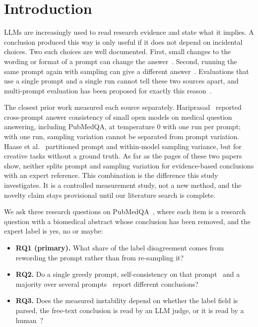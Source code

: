 \documentclass[conference]{IEEEtran}
\begin{document}
\section{Introduction}
LLMs are increasingly used to read research evidence and state what it
implies. A conclusion produced this way is only useful if it does not
depend on incidental choices. Two such choices are well documented. First,
small changes to the wording or format of a prompt can change the
answer~\cite{lu2022fantastically,zhao2021calibrate,chatterjee2024posix,zhuo2024prosa,errica2025what}.
Second, running the same prompt again with sampling can give a different
answer~\cite{cui2026same}. Evaluations that use a single prompt and a
single run cannot tell these two sources apart, and multi-prompt
evaluation has been proposed for exactly this reason~\cite{mizrahi2024state}.

The closest prior work measured each source separately.
Hariprasad~\cite{hariprasad2026prompt} reported cross-prompt answer
consistency of small open models on medical question answering, including
PubMedQA, at temperature 0 with one run per prompt; with one run, sampling
variation cannot be separated from prompt variation. Haase et
al.~\cite{haase2026within} partitioned prompt and within-model sampling
variance, but for creative tasks without a ground truth. As far as the
pages of these two papers show, neither splits prompt and sampling
variation for evidence-based conclusions with an expert reference. This
combination is the difference this study investigates. It is a
controlled measurement study, not a new method, and the novelty claim
stays provisional until our literature search is complete.

We ask three research questions on PubMedQA~\cite{jin2019pubmedqa}, where
each item is a research question with a biomedical abstract whose
conclusion has been removed, and the expert label is yes, no or maybe:
\begin{itemize}
\item \textbf{RQ1 (primary).} What share of the label disagreement comes
from rewording the prompt rather than from re-sampling it?
\item \textbf{RQ2.} Do a single greedy prompt, self-consistency on that
prompt~\cite{wang2023selfconsistency} and a majority over several
prompts~\cite{mizrahi2024state} report different conclusions?
\item \textbf{RQ3.} Does the measured instability depend on whether the
label field is parsed, the free-text conclusion is read by an LLM judge,
or it is read by a human~\cite{hua2025flaw}?
\end{itemize}
\end{document}
